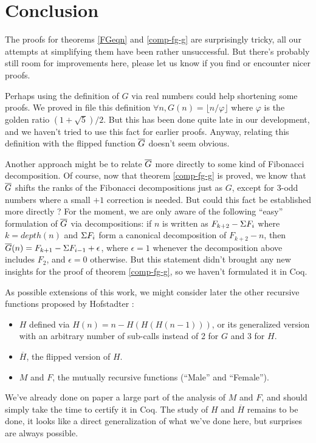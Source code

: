 \documentclass[a4paper,11pt]{article}
\begin{document}
\section{Conclusion}

The proofs for theorems \ref{FGeqn} and \ref{comp-fg-g} are
surprisingly tricky, all our attempts at simplifying them
have been rather unsuccessful. But there's probably still room
for improvements here, please let us know if you find or
encounter nicer proofs.

Perhaps using the definition of $G$
via real numbers could help shortening some proofs.
We proved in file  this definition
$\forall n, G(n)=\lfloor n/\varphi\rfloor$ where $\varphi$
is the golden ratio $(1+\sqrt{5})/2$. But this has been done
quite late in our development, and we haven't tried to use this
fact for earlier proofs. Anyway,
relating this definition with the flipped function $\overline{G}$
doesn't seem obvious.

Another approach might be to relate
$\overline{G}$ more directly to some kind of Fibonacci decomposition.
Of course, now that theorem \ref{comp-fg-g} is proved, we
know that $\overline{G}$ shifts the ranks of the Fibonacci decompositions
just as $G$, except for 3-odd numbers where a small $+1$
correction is needed. But could this fact be established more
directly ? For the moment, we are only aware of the following
``easy'' formulation of $\overline{G}$ via decompositions:
if $n$ is written as $F_{k+2}-\Sigma F_i$ where $k=depth(n)$
and $\Sigma F_i$ form a canonical decomposition of $F_{k+2}-n$, then
$\overline{G}(n)=F_{k+1}-\Sigma F_{i-1}+\epsilon$, where $\epsilon=1$ whenever
the decomposition above includes $F_2$, and $\epsilon=0$
otherwise. But this statement didn't brought any new insights
for the proof of theorem \ref{comp-fg-g}, so we haven't formulated
it in Coq.

As possible extensions of this work, we might consider later
the other recursive functions proposed by Hofstadter :
\begin{itemize}
\item $H$ defined via $H(n)=n-H(H(H(n-1)))$, or its generalized
   version with an arbitrary number of sub-calls instead of 2
   for $G$ and 3 for $H$.
\item $\overline{H}$, the flipped version of $H$.
\item $M$ and $F$, the mutually recursive functions (``Male''
and ``Female'').
\end{itemize}
We've already done on paper a large part of the analysis of
$M$ and $F$, and should simply take the time to certify
it in Coq. The study of $H$ and $\overline{H}$ remains to be
done, it looks like a direct generalization of what we've
done here, but surprises are always possible.
\end{document}
